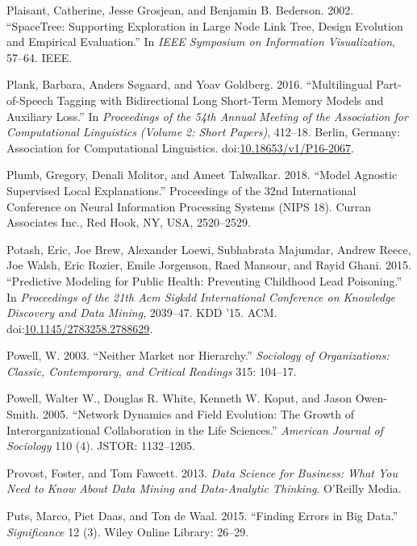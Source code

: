 \documentclass[]{krantz}
\begin{document}
\hypertarget{ref-plaisant2002spacetree}{}
Plaisant, Catherine, Jesse Grosjean, and Benjamin B. Bederson. 2002.
``SpaceTree: Supporting Exploration in Large Node Link Tree, Design
Evolution and Empirical Evaluation.'' In \emph{IEEE Symposium on
Information Visualization}, 57--64. IEEE.

\hypertarget{ref-plank-16}{}
Plank, Barbara, Anders Søgaard, and Yoav Goldberg. 2016. ``Multilingual
Part-of-Speech Tagging with Bidirectional Long Short-Term Memory Models
and Auxiliary Loss.'' In \emph{Proceedings of the 54th Annual Meeting of
the Association for Computational Linguistics (Volume 2: Short Papers)},
412--18. Berlin, Germany: Association for Computational Linguistics.
doi:\href{https://doi.org/10.18653/v1/P16-2067}{10.18653/v1/P16-2067}.

\hypertarget{ref-Plumb2018}{}
Plumb, Gregory, Denali Molitor, and Ameet Talwalkar. 2018. ``Model
Agnostic Supervised Local Explanations.'' Proceedings of the 32nd
International Conference on Neural Information Processing Systems (NIPS
18). Curran Associates Inc., Red Hook, NY, USA, 2520--2529.

\hypertarget{ref-Potash2015}{}
Potash, Eric, Joe Brew, Alexander Loewi, Subhabrata Majumdar, Andrew
Reece, Joe Walsh, Eric Rozier, Emile Jorgenson, Raed Mansour, and Rayid
Ghani. 2015. ``Predictive Modeling for Public Health: Preventing
Childhood Lead Poisoning.'' In \emph{Proceedings of the 21th Acm Sigkdd
International Conference on Knowledge Discovery and Data Mining},
2039--47. KDD '15. ACM.
doi:\href{https://doi.org/10.1145/2783258.2788629}{10.1145/2783258.2788629}.

\hypertarget{ref-powell2003neither}{}
Powell, W. 2003. ``Neither Market nor Hierarchy.'' \emph{Sociology of
Organizations: Classic, Contemporary, and Critical Readings} 315:
104--17.

\hypertarget{ref-powell2005network}{}
Powell, Walter W., Douglas R. White, Kenneth W. Koput, and Jason
Owen-Smith. 2005. ``Network Dynamics and Field Evolution: The Growth of
Interorganizational Collaboration in the Life Sciences.'' \emph{American
Journal of Sociology} 110 (4). JSTOR: 1132--1205.

\hypertarget{ref-FawcettProvost}{}
Provost, Foster, and Tom Fawcett. 2013. \emph{Data Science for Business:
What You Need to Know About Data Mining and Data-Analytic Thinking}.
O'Reilly Media.

\hypertarget{ref-puts2015finding}{}
Puts, Marco, Piet Daas, and Ton de Waal. 2015. ``Finding Errors in Big
Data.'' \emph{Significance} 12 (3). Wiley Online Library: 26--29.
\end{document}
